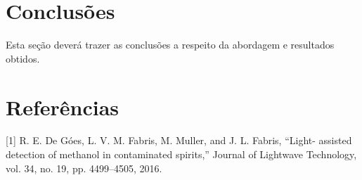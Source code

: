 \documentclass{article}
\begin{document}
\section{Conclusões}
\vspace{1cm} Esta seção deverá trazer as conclusões a respeito da
abordagem e resultados obtidos. \vspace{2cm}

\section*{Referências}
\vspace{1cm} [1] R. E. De Góes, L. V. M. Fabris, M. Muller, and J. L. Fabris, “Light-
assisted detection of methanol in contaminated spirits,” Journal of
Lightwave Technology, vol. 34, no. 19, pp. 4499–4505, 2016.
\end{document}
